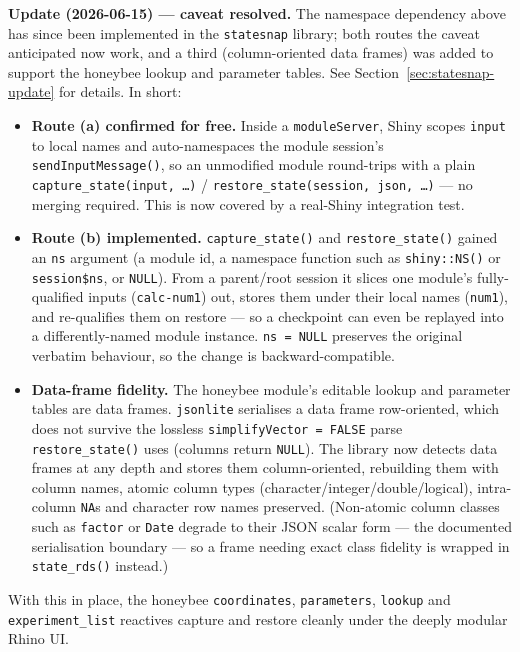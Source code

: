 \documentclass[12pt,a4paper]{article}
\begin{document}
\textbf{Update (2026-06-15) --- caveat resolved.} The namespace dependency above
has since been implemented in the \texttt{statesnap} library; both routes the
caveat anticipated now work, and a third (column-oriented data frames) was added
to support the honeybee lookup and parameter tables. See
Section~\ref{sec:statesnap-update} for details. In short:
\begin{itemize}[nosep]
  \item \textbf{Route (a) confirmed for free.} Inside a \texttt{moduleServer},
    Shiny scopes \texttt{input} to local names and auto-namespaces the module
    session's \texttt{sendInputMessage()}, so an unmodified module round-trips
    with a plain \texttt{capture\_state(input, \dots)} /
    \texttt{restore\_state(session, json, \dots)} --- no merging required. This
    is now covered by a real-Shiny integration test.
  \item \textbf{Route (b) implemented.} \texttt{capture\_state()} and
    \texttt{restore\_state()} gained an \texttt{ns} argument (a module id, a
    namespace function such as \texttt{shiny::NS()} or \texttt{session\$ns}, or
    \texttt{NULL}). From a parent/root session it slices one module's
    fully-qualified inputs (\texttt{calc-num1}) out, stores them under their
    local names (\texttt{num1}), and re-qualifies them on restore --- so a
    checkpoint can even be replayed into a differently-named module instance.
    \texttt{ns = NULL} preserves the original verbatim behaviour, so the change
    is backward-compatible.
  \item \textbf{Data-frame fidelity.} The honeybee module's editable lookup and
    parameter tables are data frames. \texttt{jsonlite} serialises a data frame
    row-oriented, which does not survive the lossless
    \texttt{simplifyVector = FALSE} parse \texttt{restore\_state()} uses (columns
    return \texttt{NULL}). The library now detects data frames at any depth and
    stores them column-oriented, rebuilding them with column names, atomic
    column types (character/integer/double/logical), intra-column \texttt{NA}s
    and character row names preserved. (Non-atomic column classes such as
    \texttt{factor} or \texttt{Date} degrade to their JSON scalar form --- the
    documented serialisation boundary --- so a frame needing exact class fidelity
    is wrapped in \texttt{state\_rds()} instead.)
\end{itemize}
With this in place, the honeybee \texttt{coordinates}, \texttt{parameters},
\texttt{lookup} and \texttt{experiment\_list} reactives capture and restore
cleanly under the deeply modular Rhino UI.
\end{document}
